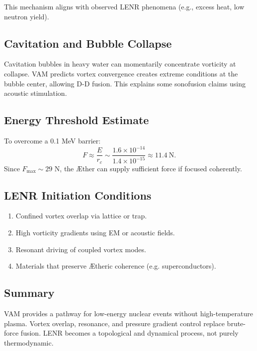 This mechanism aligns with observed LENR phenomena (e.g., excess heat, low neutron yield).

\subsection{Cavitation and Bubble Collapse}
Cavitation bubbles in heavy water can momentarily concentrate vorticity at collapse. VAM predicts vortex convergence creates extreme conditions at the bubble center, allowing D-D fusion. This explains some sonofusion claims using acoustic stimulation.

\subsection{Energy Threshold Estimate}
To overcome a 0.1 MeV barrier:
\[
    F \approx \frac{E}{r_c} \sim \frac{1.6\times10^{-14}}{1.4\times10^{-15}} \approx 11.4~\text{N}.
\]
Since $F_{\max} \sim 29$ N, the Æther can supply sufficient force if focused coherently.

\subsection{LENR Initiation Conditions}
\begin{enumerate}
    \item Confined vortex overlap via lattice or trap.
    \item High vorticity gradients using EM or acoustic fields.
    \item Resonant driving of coupled vortex modes.
    \item Materials that preserve Ætheric coherence (e.g. superconductors).
\end{enumerate}

\subsection{Summary}
VAM provides a pathway for low-energy nuclear events without high-temperature plasma. Vortex overlap, resonance, and pressure gradient control replace brute-force fusion. LENR becomes a topological and dynamical process, not purely thermodynamic.
